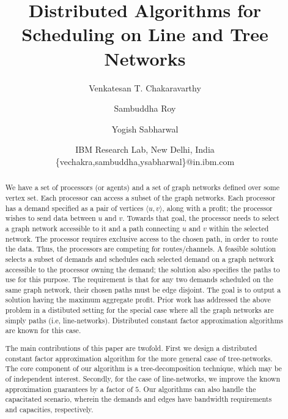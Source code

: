 \documentclass[11pt]{article}
\title{Distributed Algorithms for Scheduling on Line and Tree Networks}
\author{
Venkatesan T. Chakaravarthy \and Sambuddha Roy \and Yogish Sabharwal
}
\date{IBM Research Lab, New Delhi, India\\
\{vechakra,sambuddha,ysabharwal\}@in.ibm.com
}
\newcommand{\pair}[2] {\langle #1,#2 \rangle}
\begin{document}
\maketitle              

\begin{abstract}
We have a set of processors (or agents) and a set of graph networks defined over some vertex set.
Each processor can access a subset of the graph networks.
Each processor has a demand specified as a pair of vertices $\pair{u}{v}$, along with a profit; 
the processor wishes to send data between $u$ and $v$.
Towards that goal, the processor needs to select a graph network accessible to it
and a path connecting $u$ and $v$ within the selected network.
The processor requires exclusive access to the chosen path, in order to route the data.
Thus, the processors are competing for routes/channels.
A feasible solution selects a subset of demands and schedules each selected demand
on a graph network accessible to the processor owning the demand; the solution also 
specifies the paths to use for this purpose.
The requirement is that for any two demands scheduled on the same graph network,
their chosen paths must be edge disjoint.
The goal is to output a solution having the maximum aggregate profit.
Prior work has addressed the above problem in a distibuted setting
for the special case where all the graph networks are simply paths (i.e, line-networks).
Distributed constant factor approximation algorithms are known for this case.

The main contributions of this paper are twofold. 
First we design a distributed constant factor approximation algorithm for the more general case of tree-networks.
The core component of our algorithm is a tree-decomposition technique, which may be of independent interest.
Secondly, for the case of line-networks, we improve the known approximation guarantees by a factor of $5$.
Our algorithms can also handle the capacitated scenario, wherein the demands and edges have bandwidth requirements
and capacities, respectively.
\end{abstract}
\end{document}
